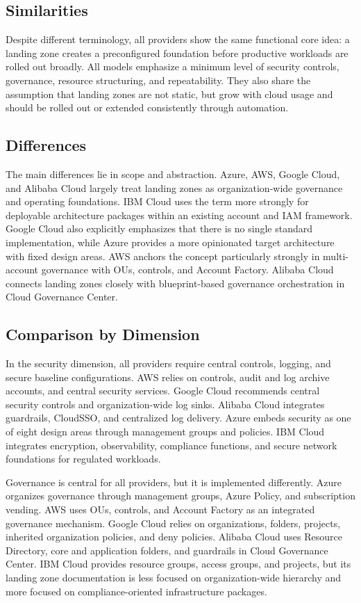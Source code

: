 \subsection{Similarities}

Despite different terminology, all providers show the same functional core idea: a landing zone creates a preconfigured foundation before productive workloads are rolled out broadly. All models emphasize a minimum level of security controls, governance, resource structuring, and repeatability. They also share the assumption that landing zones are not static, but grow with cloud usage and should be rolled out or extended consistently through automation.

\subsection{Differences}

The main differences lie in scope and abstraction. Azure, AWS, Google Cloud, and Alibaba Cloud largely treat landing zones as organization-wide governance and operating foundations. IBM Cloud uses the term more strongly for deployable architecture packages within an existing account and IAM framework. Google Cloud also explicitly emphasizes that there is no single standard implementation, while Azure provides a more opinionated target architecture with fixed design areas. AWS anchors the concept particularly strongly in multi-account governance with OUs, controls, and Account Factory. Alibaba Cloud connects landing zones closely with blueprint-based governance orchestration in Cloud Governance Center.

\subsection{Comparison by Dimension}

In the security dimension, all providers require central controls, logging, and secure baseline configurations. AWS relies on controls, audit and log archive accounts, and central security services. Google Cloud recommends central security controls and organization-wide log sinks. Alibaba Cloud integrates guardrails, CloudSSO, and centralized log delivery. Azure embeds security as one of eight design areas through management groups and policies. IBM Cloud integrates encryption, observability, compliance functions, and secure network foundations for regulated workloads.

Governance is central for all providers, but it is implemented differently. Azure organizes governance through management groups, Azure Policy, and subscription vending. AWS uses OUs, controls, and Account Factory as an integrated governance mechanism. Google Cloud relies on organizations, folders, projects, inherited organization policies, and deny policies. Alibaba Cloud uses Resource Directory, core and application folders, and guardrails in Cloud Governance Center. IBM Cloud provides resource groups, access groups, and projects, but its landing zone documentation is less focused on organization-wide hierarchy and more focused on compliance-oriented infrastructure packages.

